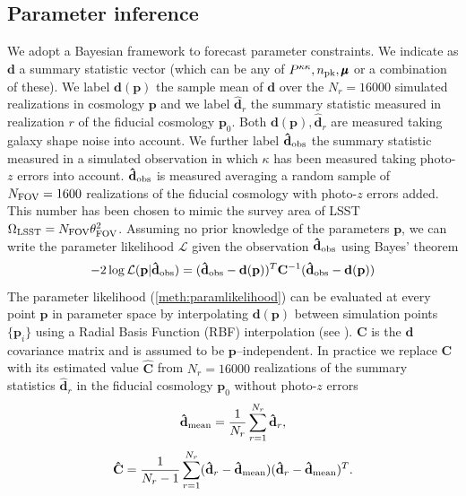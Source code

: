 \documentclass[reprint,aps,prd,superscriptaddress,showkeys,showpacs]{revtex4-1}
\newcommand{\bb}[1]{\mathbf{#1}}
\newcommand{\bbh}[1]{\mathbf{\hat{#1}}}
\begin{document}

\subsection{Parameter inference}
We adopt a Bayesian framework to forecast parameter constraints. We indicate as $\bb{d}$ a summary statistic vector (which can be any of $P^{\kappa\kappa},n_{\rm pk},\pmb{\mu}$ or a combination of these). We label $\bb{d}(\bb{p})$ the sample mean of $\bb{d}$ over the $N_r=16000$ simulated realizations in cosmology $\bb{p}$ and we label $\bbh{d}_r$ the summary statistic measured in realization $r$ of the fiducial cosmology $\bb{p}_0$. Both $\bb{d}(\bb{p}),\bbh{d}_r$ are measured taking galaxy shape noise into account. We further label $\bbh{d}_{\rm obs}$ the summary statistic measured in a simulated observation in which $\kappa$ has been measured taking photo-$z$ errors into account. $\bbh{d}_{\rm obs}$ is measured averaging a random sample of $N_{\rm FOV}=1600$ realizations of the fiducial cosmology with photo-$z$ errors added. This number has been chosen to mimic the survey area of LSST $\Omega_{\rm LSST}=N_{\rm FOV}\theta_{\rm FOV}^2$. Assuming no prior knowledge of the parameters $\bb{p}$, we can write the parameter likelihood $\mathcal{L}$ given the observation $\bbh{d}_{\rm obs}$ using Bayes' theorem
%
\begin{equation}
\label{meth:paramlikelihood}
-2\log\mathcal{L}(\bb{p}\vert \bbh{d}_{\rm obs}) = (\bbh{d}_{\rm obs} - \bb{d}(\bb{p}))^T\bb{C}^{-1}(\bbh{d}_{\rm obs} - \bb{d}(\bb{p}))
\end{equation}  
%
The parameter likelihood (\ref{meth:paramlikelihood}) can be evaluated at every point $\bb{p}$ in parameter space by interpolating $\bb{d}(\bb{p})$ between simulation points $\{\bb{p}_i\}$ using a Radial Basis Function (RBF) interpolation (see \citep{CFHTMink,LensTools-paper}). $\bb{C}$ is the $\bb{d}$ covariance matrix and is assumed to be $\bb{p}$--independent. In practice we replace $\bb{C}$ with its estimated value $\bbh{C}$ from $N_r=16000$ realizations of the summary statistics $\bbh{d}_r$ in the fiducial cosmology $\bb{p}_0$ without photo-$z$ errors
%
\begin{equation}
\bbh{d}_{\rm mean} = \frac{1}{N_r}\sum_{r=1}^{N_r}\bbh{d}_r ,
\end{equation}
%
\begin{equation}
\bbh{C} = \frac{1}{N_r-1}\sum_{r=1}^{N_r} (\bbh{d}_r-\bbh{d}_{\rm mean})(\bbh{d}_r-\bbh{d}_{\rm mean})^T .
\end{equation} 
\end{document}
